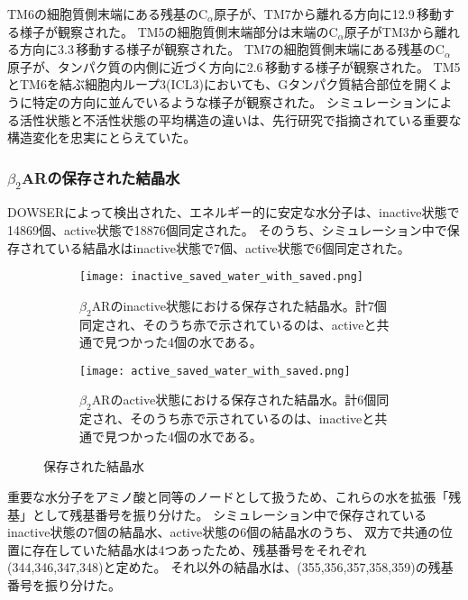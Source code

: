 \newpage

TM6の細胞質側末端にある残基の$\mathrm{C}_\alpha$原子が、TM7から離れる方向に12.9\,\text{\AA}移動する様子が観察された。
TM5の細胞質側末端部分は末端の$\mathrm{C}_\alpha$原子がTM3から離れる方向に3.3\,\text{\AA}移動する様子が観察された。
TM7の細胞質側末端にある残基の$\mathrm{C}_\alpha$原子が、タンパク質の内側に近づく方向に2.6\,\text{\AA}移動する様子が観察された。
TM5とTM6を結ぶ細胞内ループ3(ICL3)においても、Gタンパク質結合部位を開くように特定の方向に並んでいるような様子が観察された。
シミュレーションによる活性状態と不活性状態の平均構造の違いは、先行研究で指摘されている重要な構造変化を忠実にとらえていた。

\subsubsection{$\beta_2$ARの保存された結晶水}
DOWSERによって検出された、エネルギー的に安定な水分子は、inactive状態で14869個、active状態で18876個同定された。
そのうち、シミュレーション中で保存されている結晶水はinactive状態で7個、active状態で6個同定された。

\begin{figure}[htbp]
    \centering
    \begin{subfigure}{0.48\textwidth} %
      \centering
      \texttt{[image: inactive\_saved\_water\_with\_saved.png]}
      \caption{$\beta_2$ARのinactive状態における保存された結晶水。計7個同定され、そのうち赤で示されているのは、activeと共通で見つかった4個の水である。}
      \label{fig:inactive_water}
    \end{subfigure}
    \hspace{0.02\textwidth} %
    \begin{subfigure}{0.48\textwidth}
      \centering
      \texttt{[image: active\_saved\_water\_with\_saved.png]}
      \caption{$\beta_2$ARのactive状態における保存された結晶水。計6個同定され、そのうち赤で示されているのは、inactiveと共通で見つかった4個の水である。}
      \label{fig:active_water}
    \end{subfigure}
    \caption{保存された結晶水}
    \label{fig:water-all}
  \end{figure}

\newpage

重要な水分子をアミノ酸と同等のノードとして扱うため、これらの水を拡張「残基」として残基番号を振り分けた。
シミュレーション中で保存されているinactive状態の7個の結晶水、active状態の6個の結晶水のうち、
双方で共通の位置に存在していた結晶水は4つあったため、残基番号をそれぞれ(344,346,347,348)と定めた。
それ以外の結晶水は、(355,356,357,358,359)の残基番号を振り分けた。

